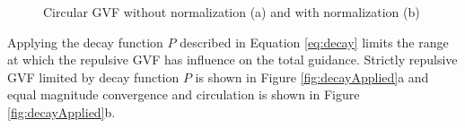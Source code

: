 \documentclass[numbered,pdftex]{ohio-etd}
\begin{document}
\begin{figure}[H]
	\begin{subfigmatrix}{2}%
		\centering	
		\hspace*{0mm}
	\end{subfigmatrix}
	\caption{Circular GVF without normalization (a) and with normalization (b)}
	\label{fig:gvfCircCirculation}
\end{figure}

Applying the decay function $P$ described in Equation \ref{eq:decay} limits the range at which the repulsive GVF has influence on the total guidance. Strictly repulsive GVF limited by decay function $P$ is shown in Figure \ref{fig:decayApplied}a and equal magnitude convergence and circulation is shown in Figure \ref{fig:decayApplied}b.
\end{document}
